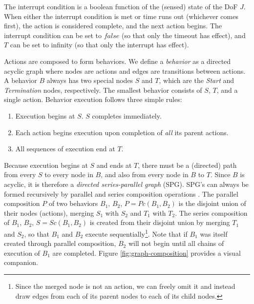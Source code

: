 \documentclass[conference]{IEEEtran}
\theoremstyle{definition}
\begin{document}
The interrupt condition is a boolean function of the (sensed) state of the DoF \(J\).
When either the interrupt condition is met or time runs out (whichever comes
first), the action is considered complete, and the next action  begins. The
interrupt condition can be set to \(false\) (so that only the timeout has effect),
and \(T\) can be set to infinity (so that only the interrupt has effect).

Actions are composed to form behaviors. We define a \textit{behavior} as a directed acyclic graph where nodes are
actions and edges are transitions between actions.  A behavior \(B\) always has
two special nodes \(S\) and \(T\), which are the \textit{Start} and
\textit{Termination} nodes, respectively.  The smallest behavior consists of
\(S\), \(T\), and a single action.  Behavior execution follows three simple
rules:

\begin{enumerate}
\item Execution begins at \(S\).  \(S\) completes immediately.
\item Each action begins execution upon completion of \textit{all} its parent actions.
\item All sequences of execution end at \(T\).
\end{enumerate}

Because execution begins at \(S\) and ends at \(T\), there must be a (directed)
path from every \(S\) to every node in \(B\), and also from every node in \(B\)
to \(T\). Since \(B\) is acyclic, it is therefore a \textit{directed series-parallel graph} (SPG).
SPG's can always be formed recursively by parallel and series composition
operations \cite{valdes1979recognition}. The parallel composition \(P\) of two behaviors \(B_1\),
\(B_2\), \(P = Pc(B_1, B_2)\) is the disjoint union of their nodes (actions),
merging \(S_1\) with \(S_2\) and \(T_1\) with \(T_2\). The series composition
of \(B_1\), \(B_2\), \(S = Sc(B_1, B_2)\) is created from their disjoint union
by merging \(T_1\) and \(S_2\), so that \(B_1\) and \(B_2\) execute
sequentially\footnote{Since the merged node is not an action, we can freely
omit it and instead draw edges from each of its parent nodes to each of its
child nodes.}.  Note that if \(B_1\) was itself created through parallel
composition, \(B_2\) will not begin until all chains of execution of \(B_1\)
are completed. Figure \ref{fig:graph-composition} provides a visual companion.
\end{document}
